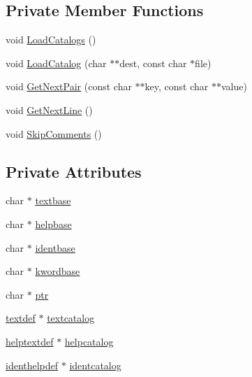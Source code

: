 \subsection*{Private Member Functions}
\begin{DoxyCompactItemize}
\item 
void \hyperlink{classStandardLanguage_afd0037d341b94b08497842470007e59b}{Load\+Catalogs} ()
\item 
void \hyperlink{classStandardLanguage_a4fe22e49f3ce358690242d0b1058ccfa}{Load\+Catalog} (char $\ast$$\ast$dest, const char $\ast$file)
\item 
void \hyperlink{classStandardLanguage_ab1945e2e3503ce12eac28c0d08234cfb}{Get\+Next\+Pair} (const char $\ast$$\ast$key, const char $\ast$$\ast$value)
\item 
void \hyperlink{classStandardLanguage_a8a4a4a2879f1e907c17f36dfafdebd66}{Get\+Next\+Line} ()
\item 
void \hyperlink{classStandardLanguage_af0078bbe8a06f6e4fb35ddfda1170e19}{Skip\+Comments} ()
\end{DoxyCompactItemize}
\subsection*{Private Attributes}
\begin{DoxyCompactItemize}
\item 
char $\ast$ \hyperlink{classStandardLanguage_a6b73c841d7401e608576087468ccc088}{textbase}
\item 
char $\ast$ \hyperlink{classStandardLanguage_a59e4ecff11a3a1f03aeff6af81004c2a}{helpbase}
\item 
char $\ast$ \hyperlink{classStandardLanguage_af3bade0473bfa891d45f7938043df84f}{identbase}
\item 
char $\ast$ \hyperlink{classStandardLanguage_a02ebeba276a3f355b73533eb8a664673}{kwordbase}
\item 
char $\ast$ \hyperlink{classStandardLanguage_a4cf91a3b08223744f1ef342b0f98bb3b}{ptr}
\item 
\hyperlink{structtextdef}{textdef} $\ast$ \hyperlink{classStandardLanguage_a2b32cc8ca90d4e3da23b83647ce83031}{textcatalog}
\item 
\hyperlink{structhelptextdef}{helptextdef} $\ast$ \hyperlink{classStandardLanguage_a75febfaeb78c26265b46b77d6fc5869c}{helpcatalog}
\item 
\hyperlink{structidenthelpdef}{identhelpdef} $\ast$ \hyperlink{classStandardLanguage_afecc69960bfb65e8658c7bc10d99fd51}{identcatalog}
\end{DoxyCompactItemize}
